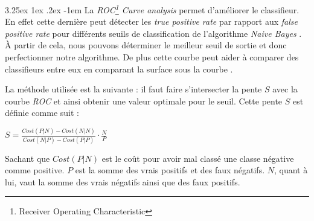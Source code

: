 \documentclass[a4paper, 11pt]{article}
\makeatletter
\renewcommand\paragraph{\@startsection{paragraph}{5}{\z@}%
  {3.25ex \@plus1ex \@minus.2ex}%
  {-1em}%
  {\normalfont\normalsize\bfseries}}
\makeatother
\begin{document}
\paragraph{}\label{section roc curve analysis}
La \textit{ROC\footnote{Receiver Operating Characteristic} Curve analysis} permet d'améliorer le classifieur. 
En effet cette dernière peut détecter les \textit{true positive rate} par rapport aux \textit{false positive rate} 
pour différents seuils de classification de l'algorithme \textit{Naive Bayes} \cite{machine_learning_automated_trading}. 
À partir de cela, nous pouvons déterminer le meilleur seuil de sortie et donc perfectionner notre algorithme.
De plus cette courbe peut aider à comparer des classifieurs entre eux en comparant 
la surface sous la courbe \cite{machine_learning_automated_trading}.

La méthode utilisée est la suivante \cite{machine_learning_automated_trading}: il faut faire s'intersecter 
la pente $S$ avec la courbe \textit{ROC} et ainsi obtenir une valeur optimale pour le seuil.
Cette pente $S$ est définie comme suit \cite{machine_learning_automated_trading}:
\begin{center}
$S = \frac{Cost(P|N) - Cost(N|N)}{Cost(N|P) - Cost(P|P)} \cdot \frac{N}{P}$
\end{center}
Sachant que $Cost(P|N)$ est le coût pour avoir mal classé une classe négative comme positive. 
$P$ est la somme des vrais positifs et des faux négatifs. $N$, quant à lui, 
vaut la somme des vrais négatifs ainsi que des faux positifs.
\end{document}
